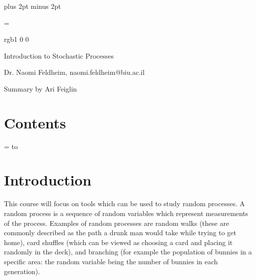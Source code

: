 

\parindent=0cm
\parskip=3pt plus 2pt minus 2pt





\footline={}



\color rgb{1 0 0}

{\def\boxshadowcolor{rgb{.8 0 0}}

    \centerline{Introduction to Stochastic Processes}
    \smallskip
    \centerline{Dr. Naomi Feldheim, naomi.feldheim@biu.ac.il}
    \centerline{Summary by Ari Feiglin}

\eppbox

\bigskip

\section*{Contents}

\tableofcontents
\eppbox

}

\vfill\break

\color{black}

\null
\vfill\break

\newif\ifpageodd
\pageoddtrue
\headline={%
    \hbox to \hsize{\color{black}%
        \ifpageodd\hfil{\it\currsubsection\quad\bf\folio}\global\pageoddfalse%
        \else{\bf\folio\quad\it\currsubsection}\hfil\global\pageoddtrue\fi%
    }%
}

\section{Introduction}

This course will focus on tools which can be used to study random processes.
A random process is a sequence of random variables which represent measurements of the process.
Examples of random processes are random walks (these are commonly described as the path a drunk man would take while trying to get home), card shuffles (which can be viewed as choosing a card and placing
it randomly in the deck), and branching (for example the population of bunnies in a specific area: the random variable being the number of bunnies in each generation).

